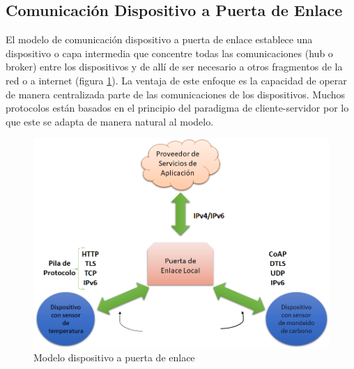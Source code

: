 \subsection{Comunicación Dispositivo a Puerta de Enlace}
El modelo de comunicación dispositivo a puerta de enlace establece una dispositivo o capa intermedia que concentre todas las comunicaciones (hub o broker) entre los dispositivos y de allí de ser necesario a otros fragmentos de la red o a internet (figura \ref{fig:d2g}). La ventaja de este enfoque es la capacidad de operar de manera centralizada parte de las comunicaciones de los dispositivos. Muchos protocolos están basados en el principio del paradigma de cliente-servidor por lo que este se adapta de manera natural al modelo.
\begin{figure}[htb]
\centering
\includegraphics[scale=0.4]{./Figuras/d2g.png}
\caption{Modelo dispositivo a puerta de enlace}
\label{fig:d2g}
\vspace*{-10pt}
\end{figure}


